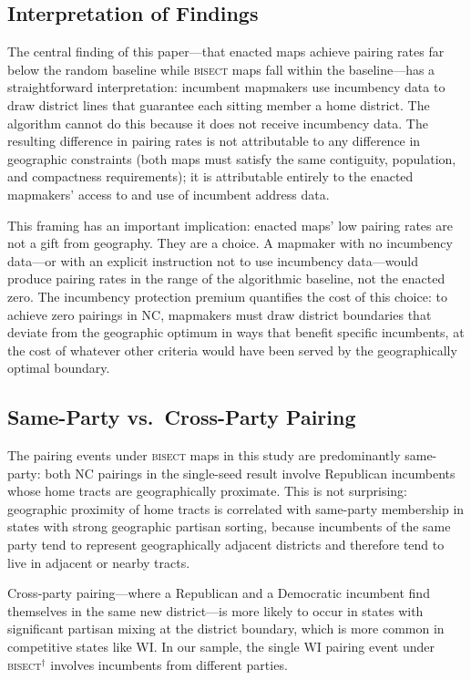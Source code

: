 \label{sec:discussion}

\subsection{Interpretation of Findings}

The central finding of this paper---that enacted maps achieve pairing rates far below
the random baseline while \textsc{bisect} maps fall within the baseline---has a
straightforward interpretation: incumbent mapmakers use incumbency data to draw district
lines that guarantee each sitting member a home district. The algorithm cannot do this
because it does not receive incumbency data. The resulting difference in pairing rates
is not attributable to any difference in geographic constraints (both maps must satisfy
the same contiguity, population, and compactness requirements); it is attributable
entirely to the enacted mapmakers' access to and use of incumbent address data.

This framing has an important implication: enacted maps' low pairing rates are not a
gift from geography. They are a choice. A mapmaker with no incumbency data---or with
an explicit instruction not to use incumbency data---would produce pairing rates in the
range of the algorithmic baseline, not the enacted zero. The incumbency protection
premium quantifies the cost of this choice: to achieve zero pairings in NC, mapmakers
must draw district boundaries that deviate from the geographic optimum in ways that
benefit specific incumbents, at the cost of whatever other criteria would have been
served by the geographically optimal boundary.

\subsection{Same-Party vs.\ Cross-Party Pairing}

The pairing events under \textsc{bisect} maps in this study are predominantly
same-party: both NC pairings in the single-seed result involve Republican incumbents
whose home tracts are geographically proximate. This is not surprising: geographic
proximity of home tracts is correlated with same-party membership in states with
strong geographic partisan sorting, because incumbents of the same party tend to
represent geographically adjacent districts and therefore tend to live in adjacent
or nearby tracts.

Cross-party pairing---where a Republican and a Democratic incumbent find themselves
in the same new district---is more likely to occur in states with significant partisan
mixing at the district boundary, which is more common in competitive states like WI.
In our sample, the single WI pairing event under \textsc{bisect}$^\dagger$ involves
incumbents from different parties.

